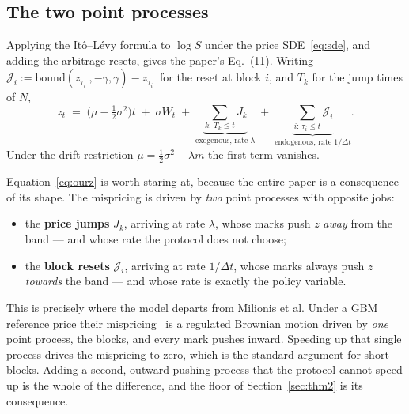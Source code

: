 \documentclass[11pt]{article}
\theoremstyle{definition}
\theoremstyle{remark}
\newcommand{\dt}{\Delta t}
\newcommand{\1}{\mathbf{1}}
\newcommand{\bound}{\mathrm{bound}}
\begin{document}
\subsection{The two point processes}

Applying the It\^o--L\'evy formula \cite[Prop.~8.14]{cont2003financial} to $\log S$ under the price SDE~\eqref{eq:sde}, and adding the arbitrage resets, gives the paper's Eq.~(11). Writing $\mathcal J_i := \bound(z_{\tau_i^-},-\gamma,\gamma) - z_{\tau_i^-}$ for the reset at block $i$, and $T_k$ for the jump times of $N$,
\begin{equation}\label{eq:ourz}
\boxed{\;z_t \;=\; \big(\mu - \tfrac12\sigma^2\big)t \;+\; \sigma W_t \;+\; \underbrace{\sum_{k:\,T_k \le t} J_k}_{\text{exogenous, rate }\lambda} \;+\; \underbrace{\sum_{i:\,\tau_i \le t} \mathcal J_i}_{\text{endogenous, rate }1/\dt}. \;}
\end{equation}
Under the drift restriction $\mu = \tfrac12\sigma^2 - \lambda m$ the first term vanishes.

Equation~\eqref{eq:ourz} is worth staring at, because the entire paper is a consequence of its shape. The mispricing is driven by \emph{two} point processes with opposite jobs:
\begin{itemize}[leftmargin=2em]
\item the \textbf{price jumps} $J_k$, arriving at rate $\lambda$, whose marks push $z$ \emph{away} from the band --- and whose rate the protocol does not choose;
\item the \textbf{block resets} $\mathcal J_i$, arriving at rate $1/\dt$, whose marks always push $z$ \emph{towards} the band --- and whose rate is exactly the policy variable.
\end{itemize}
This is precisely where the model departs from Milionis et al. Under a GBM reference price their mispricing~\cite[Eq.~(9)]{milionis2023automated} is a regulated Brownian motion driven by \emph{one} point process, the blocks, and every mark pushes inward. Speeding up that single process drives the mispricing to zero, which is the standard argument for short blocks. Adding a second, outward-pushing process that the protocol cannot speed up is the whole of the difference, and the floor of Section~\ref{sec:thm2} is its consequence.
\end{document}

